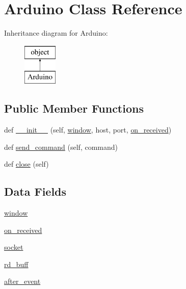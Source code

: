 \hypertarget{class_g_u_i_01_briefkasten_1_1_arduino}{}\section{Arduino Class Reference}
\label{class_g_u_i_01_briefkasten_1_1_arduino}
Inheritance diagram for Arduino\+:\begin{figure}[H]
\begin{center}
\leavevmode
\includegraphics[height=2.000000cm]{class_g_u_i_01_briefkasten_1_1_arduino}
\end{center}
\end{figure}
\subsection*{Public Member Functions}
\begin{DoxyCompactItemize}
\item 
def \mbox{\hyperlink{class_g_u_i_01_briefkasten_1_1_arduino_a86404a4415caa006d76a1b7afa696fee}{\+\_\+\+\_\+init\+\_\+\+\_\+}} (self, \mbox{\hyperlink{class_g_u_i_01_briefkasten_1_1_arduino_a04a8a2bbfa9c15500892b8e5033d625b}{window}}, host, port, \mbox{\hyperlink{class_g_u_i_01_briefkasten_1_1_arduino_a7d39fd2404163714885928c07d431b76}{on\+\_\+received}})
\item 
def \mbox{\hyperlink{class_g_u_i_01_briefkasten_1_1_arduino_a05097bd2ea4ca3b2c17d7b7164a67539}{send\+\_\+command}} (self, command)
\item 
def \mbox{\hyperlink{class_g_u_i_01_briefkasten_1_1_arduino_a8639372c33e15084a7f7c4d9d87b7bfe}{close}} (self)
\end{DoxyCompactItemize}
\subsection*{Data Fields}
\begin{DoxyCompactItemize}
\item 
\mbox{\hyperlink{class_g_u_i_01_briefkasten_1_1_arduino_a04a8a2bbfa9c15500892b8e5033d625b}{window}}
\item 
\mbox{\hyperlink{class_g_u_i_01_briefkasten_1_1_arduino_a7d39fd2404163714885928c07d431b76}{on\+\_\+received}}
\item 
\mbox{\hyperlink{class_g_u_i_01_briefkasten_1_1_arduino_a84edc84c8145e7997b70f9919ce44d68}{socket}}
\item 
\mbox{\hyperlink{class_g_u_i_01_briefkasten_1_1_arduino_a1ea8c1aa4f00109a4c17150885fd08c8}{rd\+\_\+buff}}
\item 
\mbox{\hyperlink{class_g_u_i_01_briefkasten_1_1_arduino_a5299b01fe1537dddabd0e50400e0e9be}{after\+\_\+event}}
\end{DoxyCompactItemize}


